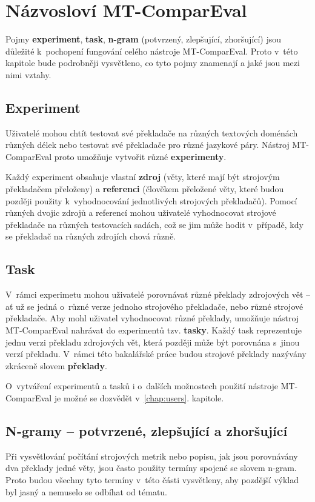 \chapter{Názvosloví MT-ComparEval}
\label{chap:experiments}

Pojmy \textbf{experiment}, \textbf{task}, \textbf{\mbox{n-gram}} (potvrzený, zlepšující, zhoršující) jsou důležité k~pochopení fungování celého nástroje MT-ComparEval.
Proto v~této kapitole bude podrobněji vysvětleno,
  co tyto pojmy znamenají a jaké jsou mezi nimi vztahy.

\section{Experiment}
Uživatelé mohou chtít testovat své překladače na různých textových doménách různých délek
  nebo testovat své překladače pro různé jazykové páry.
Nástroj MT-ComparEval proto umožňuje vytvořit různé \textbf{experimenty}.

Každý experiment obsahuje vlastní \textbf{zdroj} (věty, které mají být strojovým překladačem přeloženy) a
  \textbf{referenci} (člověkem přeložené věty, které budou později použity k~vyhodnocování jednotlivých strojových překladačů).
Pomocí různých dvojic zdrojů a referencí mohou uživatelé vyhodnocovat strojové překladače na různých testovacích sadách,
  což se jim může hodit v~případě,
  kdy se překladač na různých zdrojích chová různě.

\section{Task}
V~rámci experimetu mohou uživatelé porovnávat různé překlady zdrojových vět --
  ať už se jedná o~různé verze jednoho strojového překladače, nebo různé strojové překladače.
Aby mohl uživatel vyhodnocovat různé překlady,
  umožňuje nástroj MT-ComparEval nahrávat do experimentů tzv. \textbf{tasky}.
Každý task reprezentuje jednu verzi překladu zdrojových vět,
  která později může být porovnána s~jinou verzí překladu.
V~rámci této bakalářské práce budou strojové překlady nazývány zkráceně slovem \textbf{překlady}.

O~vytváření experimentů a tasků i o~dalších možnostech použití nástroje MT-ComparEval je možné se dozvědět v~\ref{chap:users}. kapitole.

\section{N-gramy -- potvrzené, zlepšující a zhoršující}
Při vysvětlování počítání strojových metrik
  nebo popisu, jak jsou porovnávány dva překlady jedné věty,
  jsou často použity termíny spojené se slovem \mbox{n-gram}.
Proto budou všechny tyto termíny v~této části vysvětleny,
  aby pozdější výklad byl jasný a nemuselo se odbíhat od tématu.


